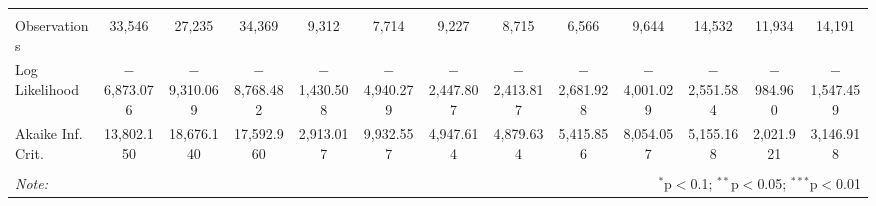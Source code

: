 \begin{longtable}{@{\extracolsep{5pt}}lcccccccccccc}
\hline \\[-1.8ex] 
Observations & 33,546 & 27,235 & 34,369 & 9,312 & 7,714 & 9,227 & 8,715 & 6,566 & 9,644 & 14,532 & 11,934 & 14,191 \\ 
Log Likelihood & $-$6,873.076 & $-$9,310.069 & $-$8,768.482 & $-$1,430.508 & $-$4,940.279 & $-$2,447.807 & $-$2,413.817 & $-$2,681.928 & $-$4,001.029 & $-$2,551.584 & $-$984.960 & $-$1,547.459 \\ 
Akaike Inf. Crit. & 13,802.150 & 18,676.140 & 17,592.960 & 2,913.017 & 9,932.557 & 4,947.614 & 4,879.634 & 5,415.856 & 8,054.057 & 5,155.168 & 2,021.921 & 3,146.918 \\ 
\hline 
\hline \\[-1.8ex] 
\textit{Note:}  & \multicolumn{12}{r}{$^{*}$p$<$0.1; $^{**}$p$<$0.05; $^{***}$p$<$0.01} \\ 
\end{longtable} 
